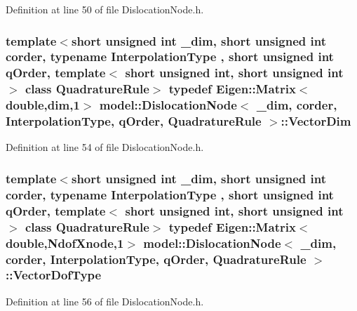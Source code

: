 Definition at line 50 of file Dislocation\+Node.\+h.

\hypertarget{classmodel_1_1_dislocation_node_a24f59a87745e7b05b151b5f5017172b0}{}
\subsubsection[{Vector\+Dim}]{\setlength{\rightskip}{0pt plus 5cm}template$<$short unsigned int \+\_\+dim, short unsigned int corder, typename Interpolation\+Type , short unsigned int q\+Order, template$<$ short unsigned int, short unsigned int $>$ class Quadrature\+Rule$>$ typedef Eigen\+::\+Matrix$<$double,{\bf dim},1$>$ {\bf model\+::\+Dislocation\+Node}$<$ \+\_\+dim, corder, Interpolation\+Type, q\+Order, Quadrature\+Rule $>$\+::{\bf Vector\+Dim}}\label{classmodel_1_1_dislocation_node_a24f59a87745e7b05b151b5f5017172b0}


Definition at line 54 of file Dislocation\+Node.\+h.

\hypertarget{classmodel_1_1_dislocation_node_a7def555ec4b0751177d47d703c8f9282}{}
\subsubsection[{Vector\+Dof\+Type}]{\setlength{\rightskip}{0pt plus 5cm}template$<$short unsigned int \+\_\+dim, short unsigned int corder, typename Interpolation\+Type , short unsigned int q\+Order, template$<$ short unsigned int, short unsigned int $>$ class Quadrature\+Rule$>$ typedef Eigen\+::\+Matrix$<$double,Ndof\+Xnode,1$>$ {\bf model\+::\+Dislocation\+Node}$<$ \+\_\+dim, corder, Interpolation\+Type, q\+Order, Quadrature\+Rule $>$\+::{\bf Vector\+Dof\+Type}}\label{classmodel_1_1_dislocation_node_a7def555ec4b0751177d47d703c8f9282}


Definition at line 56 of file Dislocation\+Node.\+h.

\hypertarget{classmodel_1_1_dislocation_node_a56f2de43c8df74c51f544b23f3b64540}{}
